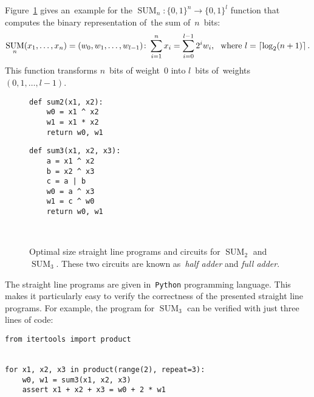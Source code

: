 \documentclass[12pt,letterpaper]{article}
\DeclareMathOperator{\SUM}{SUM}
\begin{document}
Figure~\ref{figure:sum23} gives an~example for
the 
$\SUM_n \colon \{0,1\}^n \to \{0,1\}^l$ function 
that computes the binary representation of~the sum of~$n$~bits:
\[\SUM_n(x_1, \dotsc, x_n)=(w_0, w_1, \dotsc, w_{l-1})\colon \sum_{i=1}^{n}x_i=\sum_{i=0}^{l-1}2^iw_i \text{, \, where } l=\lceil \log_2(n+1)\rceil \, .\]
This function transforms $n$~bits 
of weight~0 into $l$~bits 
of~weights $(0,1,\dotsc,l-1)$.
%
\begin{figure}[ht]
\begin{minipage}{.28\textwidth}
\begin{verbatim}
def sum2(x1, x2):
    w0 = x1 ^ x2
    w1 = x1 * x2
    return w0, w1
\end{verbatim}
\end{minipage}
\begin{minipage}{.18\textwidth}
\end{minipage}
\begin{minipage}{.33\textwidth}
\begin{verbatim}
def sum3(x1, x2, x3):
    a = x1 ^ x2
    b = x2 ^ x3
    c = a | b
    w0 = a ^ x3
    w1 = c ^ w0
    return w0, w1
\end{verbatim}
\end{minipage}
\begin{minipage}{.18\textwidth}
~
\end{minipage}
\caption{Optimal size straight line programs and circuits for $\SUM_2$ and $\SUM_3$. These two circuits are known as~\emph{half adder} and \emph{full adder}.}
\label{figure:sum23}
\end{figure}
%
The straight line
programs are given 
in~\texttt{Python} programming language.
This makes it particularly easy to verify the correctness of the presented straight line programs.
For example, the program for $\SUM_3$ can be verified
with just three lines of code:
\begin{verbatim}
from itertools import product


for x1, x2, x3 in product(range(2), repeat=3):
    w0, w1 = sum3(x1, x2, x3)    
    assert x1 + x2 + x3 = w0 + 2 * w1
\end{verbatim}
\end{document}
